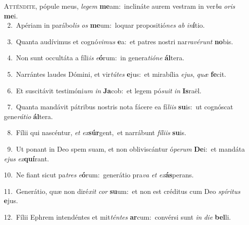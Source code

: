 \lettrine{\initial\textcolor{\initialcolor}{A}}{tténdite,} pópule meus, \textit{le}\-\textit{gem} \textbf{me}\-am:~\star inclináte aurem vestram in ver\textit{ba} \textit{o}\-\textit{ris} \textbf{me}\-i.\\
{\numbfont\textcolor{\numbcolor}{~2.}}~Apériam in parábo\textit{lis} \textit{os} \textbf{me}\-um:~\star loquar propositió\textit{nes} \textit{ab} \textit{in}\-\textbf{í}tio.\par
{\numbfont\textcolor{\numbcolor}{~3.}}~Quanta audívimus et cognó\-\textit{vi}\-\textit{mus} \textbf{e}\-a:~\star et patres nostri nar\-\textit{ra}\-\textit{vé}\textit{runt} \textbf{no}\-bis.\par
{\numbfont\textcolor{\numbcolor}{~4.}}~Non sunt occultáta a fíli\textit{is} \textit{e}\-\textbf{ó}rum:~\star in genera\-\textit{ti}\-\textit{ó}\textit{ne} \textbf{ál}\-tera.\par
{\numbfont\textcolor{\numbcolor}{~5.}}~Narrántes laudes Dómini, et vir\-\textit{tú}\-\textit{tes} \textbf{e}\-jus:~\star et mirabília \textit{e}\-\textit{jus}, \textit{quæ} \textbf{fe}\-cit.\par
{\numbfont\textcolor{\numbcolor}{~6.}}~Et suscitávit testimóni\textit{um} \textit{in} \textbf{Ja}\-cob:~\star et legem pó\-\textit{su}\-\textit{it} \textit{in} \textbf{Is}\-raël.\par
{\numbfont\textcolor{\numbcolor}{~7.}}~Quanta mandávit pátribus nostris nota fácere ea fí\-\textit{li}\-\textit{is} \textbf{su}\-is:~\star ut cognóscat gene\-\textit{rá}\-\textit{ti}\textit{o} \textbf{ál}\-tera.\par
{\numbfont\textcolor{\numbcolor}{~8.}}~Fílii qui nascéntur, \textit{et} \textit{ex}\-\textbf{súr}gent,~\star et narrábunt \textit{fí}\-\textit{li}\textit{is} \textbf{su}\-is.\par
{\numbfont\textcolor{\numbcolor}{~9.}}~Ut ponant in Deo spem suam, et non obliviscántur ó\-\textit{pe}\-\textit{rum} \textbf{De}\-i:~\star et mandáta \textit{e}\-\textit{jus} \textit{ex}\-\textbf{quí}rant.\par
{\numbfont\textcolor{\numbcolor}{10.}}~Ne fiant sicut pa\textit{tres} \textit{e}\-\textbf{ó}rum:~\star generátio pra\textit{va} \textit{et} \textit{ex}\-\textbf{ás}perans.\par
{\numbfont\textcolor{\numbcolor}{11.}}~Generátio, quæ non diré\textit{xit} \textit{cor} \textbf{su}\-um:~\star et non est créditus cum Deo \textit{spí}\-\textit{ri}\textit{tus} \textbf{e}\-jus.\par
{\numbfont\textcolor{\numbcolor}{12.}}~Fílii Ephrem intendéntes et mit\-\textit{tén}\-\textit{tes} \textbf{ar}\-cum:~\star convérsi sunt \textit{in} \textit{di}\-\textit{e} \textbf{bel}\-li.\par
